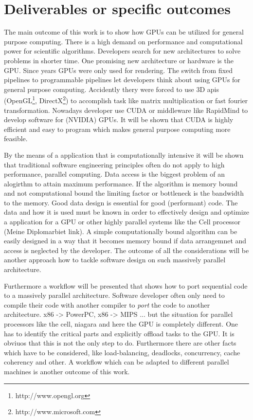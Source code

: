 \section*{Deliverables or specific outcomes} 
\label{sub:deliverables_or_specific_outcomes} 
The main outcome of this work is to show how GPUs can be utilized for general
purpose computing. There is a high demand on performance and computational power
for scientific algorithms. Developers search for new architectures to solve
problems in shorter time. One promising new architecture or hardware is the GPU.
Since years GPUs were only used for rendering. The switch from fixed pipelines
to programmable pipelines let developers think about using GPUs for general
purpose computing. Accidently thery were forced to use 3D apis
(OpenGL\footnote{http://www.opengl.org},
DirectX\footnote{http://www.microsoft.com}) to accomplish task like matrix
multiplication or fast fourier transformation. Nowadays developer use CUDA or
middleware like RapidMind to develop software for (NVIDIA) GPUs. It will be
shown that CUDA is highly efficient and easy to program which makes general
purpose computing more feasible.

By the means of a application that is computationally intensive it will be shown
that traditional software engineering principles often do not apply to high
performance, parallel computing. Data access is the biggest problem of an
alogirthm to attain maximum performance. If the algorithm is memory bound and
not computational bound the limiting factor or bottleneck is the bandwidth to
the memory. Good data design is essential for good (performant) code. The data
and how it is used must be known in order to effectively design and optimize a
application for a \gls{GPU} or other highly parallel systems like the Cell processor
(Meine Diplomarbiet link). A simple computationally bound algorithm can be
easily designed in a way that it becomes memory bound if data arrangemnet and
access is neglected by the developer. The outcome of all the considerations will
be another approach how to tackle software design on such massively parallel
architecture.

Furthermore a workflow will be presented that shows how to port sequential code
to a massively parallel architecture. Software developer often only need to
compile their code with another compiler to \emph{port} the code to another
architecture. x86 -> PowerPC, x86 -> MIPS ... but the situation for parallel
processors like the cell, niagara and here the \gls{GPU} is completely different. One
has to identify the critical parts and explicitly offload tasks to the GPU. It
is obviuos that this is not the only step to do. Furthermore there are other
facts which have to be considered, like load-balancing, deadlocks, concurrency,
cache coherency and other. A workflow which can be adapted to different parallel
machines is another outcome of this work.

